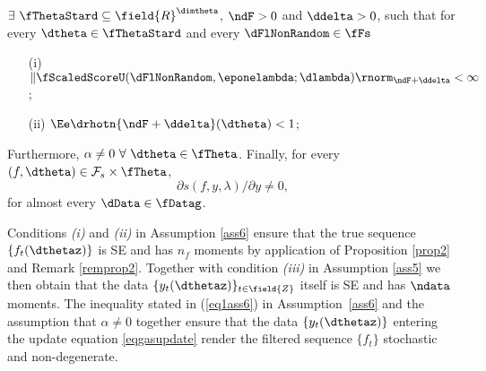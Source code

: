 \begin{ass}
\label{ass6}
$\exists\ \fThetaStard \subseteq \field{R}^{\dimtheta}$, $\ndF 
> 0$ and $\ddelta>0$, such that for every $\dtheta \in 
\fThetaStard$ and every
$\dFlNonRandom \in \fFs$ %
\begin{enumerate}
    \item[(i)] $\| \fScaledScoreU(\dFlNonRandom,\eponelambda;\dlambda) \rnorm_{\ndF+\ddelta} < \infty$;
    \item[(ii)] $\Ee %
    \drhotn{\ndF+\ddelta}(\dtheta) < 1$;
\end{enumerate}
Furthermore, $  \alpha \neq 0 \ \forall \ \dtheta \in \fTheta$. Finally, for every $(f,\dtheta) \in \mathcal{F}_{s} \times \fTheta$, 
\begin{equation}
    \label{eq1ass6}
\partial s(f,y,\lambda)/ \partial y \neq 0, %
\end{equation}
for almost every $\dData \in \fDatag$.
\end{ass}


Conditions \textit{(i)} and \textit{(ii)} in Assumption \ref{ass6} ensure that the true sequence $\{f_{t}(\dthetaz)\}$ is SE and has $n_{f}$ moments by application of Proposition \ref{prop2} and Remark \ref{remprop2}. Together with condition \textit{(iii)} in Assumption \ref{ass5} we then obtain that the data $\{y_{t}(\dthetaz)\}_{t \in \field{Z}}$ itself is SE and has $\ndata$ moments.
The inequality stated in (\ref{eq1ass6}) in Assumption~\ref{ass6} and the assumption that $\alpha \neq 0$ together ensure that the data $\{y_{t}(\dthetaz)\}$ entering the update equation \eqref{eqgasupdate} render the filtered sequence $\{f_{t}\}$ stochastic and non-degenerate.


